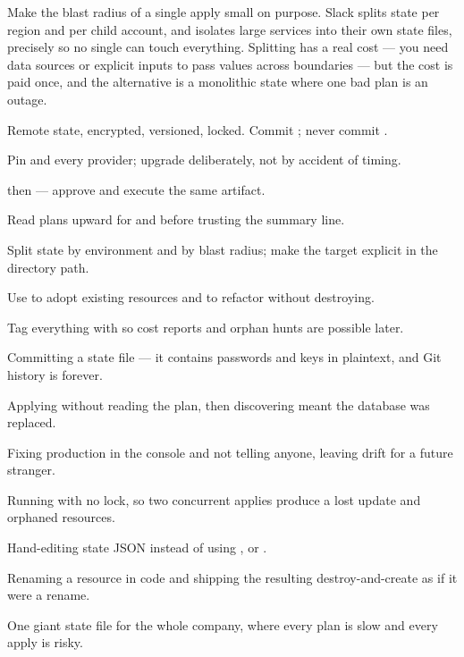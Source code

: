 \begin{reliability}
Make the blast radius of a single apply small on purpose. Slack splits state per region and per child account, and isolates large services into their own state files, precisely so no single  can touch everything. Splitting has a real cost --- you need  data sources or explicit inputs to pass values across boundaries --- but the cost is paid once, and the alternative is a monolithic state where one bad plan is an outage.
\end{reliability}

\begin{bestpractices}
\begin{wbitem}
  \item Remote state, encrypted, versioned, locked. Commit ; never commit .
  \item Pin  and every provider; upgrade deliberately, not by accident of timing.
  \item {} then  --- approve and execute the same artifact.
  \item Read plans upward for \code{-/+} and  before trusting the summary line.
  \item Split state by environment and by blast radius; make the target explicit in the directory path.
  \item Use  to adopt existing resources and  to refactor without destroying.
  \item Tag everything with  so cost reports and orphan hunts are possible later.
\end{wbitem}
\end{bestpractices}
\begin{mistakes}
\begin{wbitem}
  \item Committing a state file --- it contains passwords and keys in plaintext, and Git history is forever.
  \item Applying without reading the plan, then discovering \code{-/+} meant the database was replaced.
  \item Fixing production in the console and not telling anyone, leaving drift for a future stranger.
  \item Running with no lock, so two concurrent applies produce a lost update and orphaned resources.
  \item Hand-editing state JSON instead of using ,  or .
  \item Renaming a resource in code and shipping the resulting destroy-and-create as if it were a rename.
  \item One giant state file for the whole company, where every plan is slow and every apply is risky.
\end{wbitem}
\end{mistakes}

